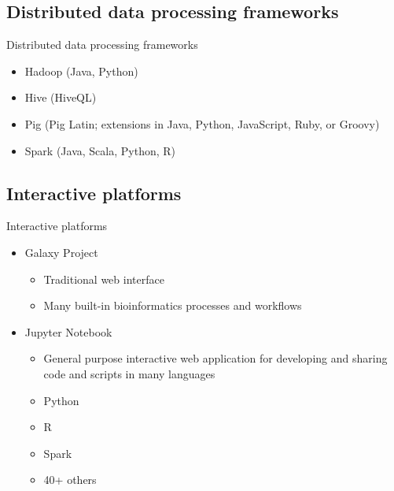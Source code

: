 \documentclass[xcolor=x11names,compress]{beamer}
\makeatletter
\newcommand{\darkcolors}{
\setbeamercolor*{normal text}{fg=white, bg=black} 
\setbeamercolor*{example text}{fg=white} 
\setbeamercolor*{structure}{fg=sangerlightblue2}  
\setbeamercolor*{frametitle}{fg=sangerlightblue2}  
\setbeamercolor*{itemize/enumerate body}{fg=white}
\setbeamercolor*{itemize/enumerate subbody}{fg=white}
}
\renewcommand{\(}{\begin{columns}}
\renewcommand{\)}{\end{columns}}
\newcommand{\<}[1]{\begin{column}{#1}}
\renewcommand{\>}{\end{column}}
\newenvironment{backgroundblock}[2]{%
  \global\setbox\@backgroundblock=\vbox\bgroup%
    \unvbox\@backgroundblock%
    \vbox to0pt\bgroup\vskip#2\hbox to0pt\bgroup\hskip#1\relax%
}{\egroup\egroup\egroup}
\makeatother
\begin{document}
\subsection*{Distributed data processing frameworks}
\begin{frame}{Distributed data processing frameworks}
\pipesbackground
{}
\begin{itemize}
	\item Hadoop (Java, Python)
	\item Hive (HiveQL)
	\item Pig (Pig Latin; extensions in Java, Python, JavaScript, Ruby, or Groovy)
	\item Spark (Java, Scala, Python, R)
\end{itemize}
\end{frame}

\subsection*{Interactive platforms}
\begin{frame}{Interactive platforms}
\pipesbackground
{}
\begin{itemize}
	\item Galaxy Project
	\begin{itemize}
	\item Traditional web interface
	\item Many built-in bioinformatics processes and workflows
	\end{itemize}
	\item Jupyter Notebook
	\begin{itemize}
	\item General purpose interactive web application for developing and sharing code and scripts in many languages
	\item Python
	\item R
	\item Spark
	\item 40+ others
	\end{itemize}
\end{itemize}
\end{frame}


\end{document}
